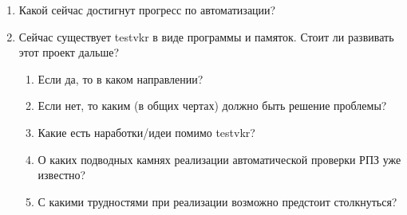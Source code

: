 \begin{enumerate}[label*=\arabic*.]
	\item Какой сейчас достигнут прогресс по автоматизации?
	
	\item Сейчас существует testvkr в виде программы и памяток. Стоит ли развивать этот проект дальше?
	\begin{enumerate}[label*=\arabic*.]
		\item Если да, то в каком направлении?
		\item Если нет, то каким (в общих чертах) должно быть решение проблемы?
		\item Какие есть наработки/идеи помимо testvkr?
		\item О каких подводных камнях реализации автоматической проверки РПЗ уже известно?
		\item С какими трудностями при реализации возможно предстоит столкнуться?
	\end{enumerate}
\end{enumerate}




%

\clearpage
